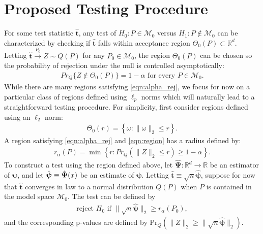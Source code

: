 \documentclass{article}
\newcommand{\sh}{\textcolor{red}}
\newcommand{\disto}{P}
\newcommand{\tst}{\hat{\boldsymbol{t}}}
\newcommand{\rvv}{Z}
\newcommand{\distv}{Q}
\newcommand{\rnp}{\sqrt{n} \hat{\boldsymbol{\psi}}}
\begin{document}

\section{Proposed Testing Procedure}
\label{sec:prop_test_proc}

For some test statistic $\tst$, any test of $H_0 : \disto \in \mathscr{M}_0$ versus $H_1 : \disto \not\in \mathscr{M}_0$ can be characterized by checking if $\tst$ falls within acceptance region $\Theta_0(\disto) \subset \mathbb{R}^d$.  Letting $\tst \xrightarrow{P_0} \rvv \sim \distv(\disto)$ for any $P_0 \in \mathscr{M}_0$, the region $\Theta_0(\disto)$ can be chosen so the probability of rejection under the null is controlled asymptotically:
\begin{align}
  Pr_{\distv}\{\rvv \not \in \Theta_0(P)\} = 1 - \alpha \text{ for every } P \in \mathscr{M}_0.\label{eqn:alpha_rej}
\end{align}
While there are many regions satisfying \eqref{eqn:alpha_rej},  we focus for now on a particular class of regions defined using $\ell_p$ norms which will naturally lead to a straightforward testing procedure. For simplicity, first consider regions defined using an $\ell_2$ norm:
\begin{align}
	\Theta_0(r) = \left\{\omega : \|\omega\|_2 \leq r\right\}. \label{eqn:region}
\end{align}
A region satisfying \eqref{eqn:alpha_rej} and \eqref{eqn:region} has a radius defined by: 
\begin{align}
	r_\alpha(\disto) = \min\left\{r : Pr_{\distv}(\|\rvv\|_2 \leq r) \geq 1 - \alpha \right\}. \label{eqn:ra}
\end{align}
To construct a test using the region defined above, let $\hat{\boldsymbol{\Psi}} : \mathbb{R}^d \to \mathbb{R}$ be an estimator of $\boldsymbol{\psi}$, and let $\Hat{\boldsymbol{\psi}} \equiv \hat{\boldsymbol{\Psi}}(x)$ be an estimate of $\boldsymbol{\psi}$. Letting $\tst \equiv \sqrt{n}\hat{\boldsymbol{\psi}}$, suppose for now that  $\tst$ converges in law to a normal distribution $\distv(P)$ when $P$ is contained in the model space  $\mathcal{M}_0$. The test can be defined by 
\begin{align}
\label{eqn:simp_test}
	\text{reject } H_0 \text{ if } \|\rnp\|_2 \geq r_\alpha(P_0),
\end{align} 
and the corresponding p-values are defined by $
	\text{Pr}_\distv(\|\rvv\|_2 \geq \|\rnp\|_2)$.
\end{document}
